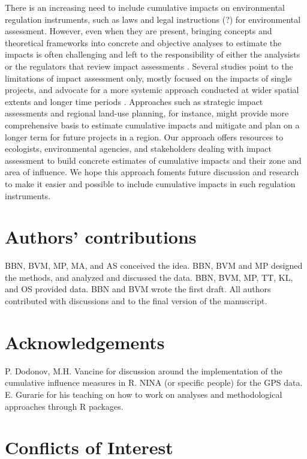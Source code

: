 \documentclass[titlepage]{article}
\begin{document}
There is an increasing need to include cumulative impacts on environmental regulation instruments, such as laws and legal instructions (?) for environmental assessment. However, even when they are present, bringing concepts and theoretical frameworks into concrete and objective analyses to estimate the impacts is often challenging and left to the responsibility of either the analysists or the regulators that review impact assessments \citep{johnson_regulating_2011,harris_grappling_2011}. Several studies point to the limitations of impact assessment only, mostly focused on the impacts of single projects, and advocate for a more systemic approach conducted at wider spatial extents and longer time periods \citep{laurance_conservation_2018,gillingham_integration_2016,krausman_cumulative_2011}. Approaches such as strategic impact assessments and regional land-use planning, for instance, might provide more comprehensive basis to estimate cumulative impacts and mitigate and plan on a longer term for future projects in a region. Our approach offers resources to ecologists, environmental agencies, and stakeholders dealing with impact assessment to build concrete estimates of cumulative impacts and their zone and area of influence. We hope this approach foments future discussion and research to make it easier and possible to include cumulative impacts in such regulation instruments.      
\section*{Authors’ contributions}

BBN, BVM, MP, MA, and AS conceived the idea. BBN, BVM and MP designed the methods, and analyzed and discussed the data. BBN, BVM, MP, TT, KL, and OS provided data. BBN and BVM wrote the first draft. All authors contributed with discussions and to the final version of the manuscript.

\section*{Acknowledgements}

P. Dodonov, M.H. Vancine for discussion around the implementation of the cumulative influence measures in R. NINA (or specific people) for the GPS data. E. Gurarie for his teaching on how to work on analyses and methodological approaches through R packages.

\section*{Conflicts of Interest}
\end{document}
